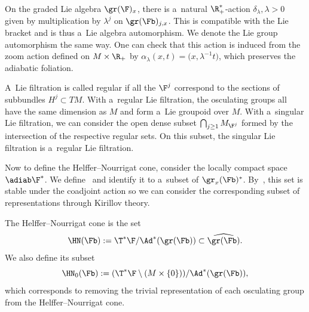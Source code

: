 On the graded Lie algebra $\gr(\F)_x$, there is a~natural $\R^*_+$-action $\delta_{\lambda}, \lambda>0$ given by multiplication by $\lambda^j$ on $\gr(\Fb)_{j,x}$. This is compatible with the Lie bracket and is thus a~Lie algebra automorphism. We denote the Lie group automorphism the same way. One can check that this action is induced from the zoom action defined on $M \times \R_+$ by $\alpha_{\lambda}(x,t) = \bigl(x,\lambda^{-1}t\bigr)$, which preserves the adiabatic foliation.

\begin{rem}
 A~Lie filtration is called regular if all the $\F^j$ correspond to the sections of subbundles $H^j \subset TM$. With a~regular Lie filtration, the osculating groups all have the same dimension as $M$ and form a~Lie groupoid over $M$. With a~singular Lie filtration, we can consider the open dense subset $\bigcap_{j\geq 1} M_{\F^j}$ formed by the intersection of the respective regular sets. On this subset, the singular Lie filtration is a~regular Lie filtration.
\end{rem}

Now to define the Helffer--Nourrigat cone, consider the locally compact space $\adiab\F^*$. We define~
and identify it to a~subset of $\gr_x(\Fb)^*$. By~\cite[Proposition~1.12]{AMYMaximalHypoellipticity}, this set is stable under the coadjoint action so we can consider the corresponding subset of representations through Kirillov theory.

\begin{mydef}\label{Def: ConeHF Intrinsic}
 The Helffer--Nourrigat cone is the set
 \[\HN(\Fb) := {\T^*\F}/{\Ad^*(\gr(\Fb))} \subset \widehat{\gr(\Fb)}.\]
 We also define its subset
 \[\HN_0(\Fb) := {(\T^*\F\setminus (M\times \{0\}))}/{\Ad^*(\gr(\Fb))},\]
 which corresponds to removing the trivial representation of each osculating group from the Helffer--Nourrigat cone.
\end{mydef}

